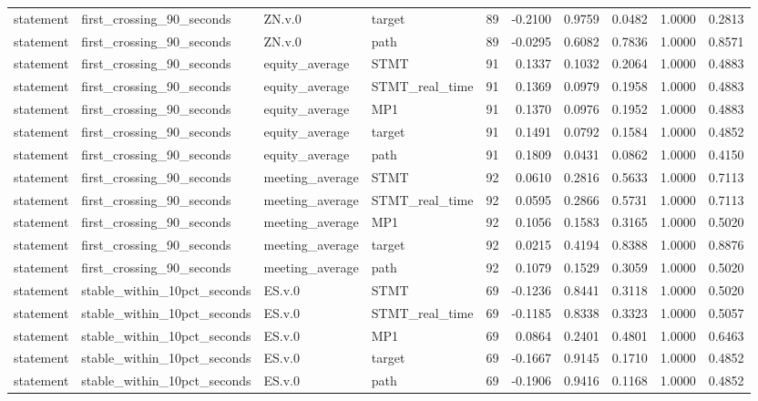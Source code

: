 \begin{tabular}{llllrrrrrr}
statement & first_crossing_90_seconds & ZN.v.0 & target & 89 & -0.2100 & 0.9759 & 0.0482 & 1.0000 & 0.2813 \\
statement & first_crossing_90_seconds & ZN.v.0 & path & 89 & -0.0295 & 0.6082 & 0.7836 & 1.0000 & 0.8571 \\
statement & first_crossing_90_seconds & equity_average & STMT & 91 & 0.1337 & 0.1032 & 0.2064 & 1.0000 & 0.4883 \\
statement & first_crossing_90_seconds & equity_average & STMT_real_time & 91 & 0.1369 & 0.0979 & 0.1958 & 1.0000 & 0.4883 \\
statement & first_crossing_90_seconds & equity_average & MP1 & 91 & 0.1370 & 0.0976 & 0.1952 & 1.0000 & 0.4883 \\
statement & first_crossing_90_seconds & equity_average & target & 91 & 0.1491 & 0.0792 & 0.1584 & 1.0000 & 0.4852 \\
statement & first_crossing_90_seconds & equity_average & path & 91 & 0.1809 & 0.0431 & 0.0862 & 1.0000 & 0.4150 \\
statement & first_crossing_90_seconds & meeting_average & STMT & 92 & 0.0610 & 0.2816 & 0.5633 & 1.0000 & 0.7113 \\
statement & first_crossing_90_seconds & meeting_average & STMT_real_time & 92 & 0.0595 & 0.2866 & 0.5731 & 1.0000 & 0.7113 \\
statement & first_crossing_90_seconds & meeting_average & MP1 & 92 & 0.1056 & 0.1583 & 0.3165 & 1.0000 & 0.5020 \\
statement & first_crossing_90_seconds & meeting_average & target & 92 & 0.0215 & 0.4194 & 0.8388 & 1.0000 & 0.8876 \\
statement & first_crossing_90_seconds & meeting_average & path & 92 & 0.1079 & 0.1529 & 0.3059 & 1.0000 & 0.5020 \\
statement & stable_within_10pct_seconds & ES.v.0 & STMT & 69 & -0.1236 & 0.8441 & 0.3118 & 1.0000 & 0.5020 \\
statement & stable_within_10pct_seconds & ES.v.0 & STMT_real_time & 69 & -0.1185 & 0.8338 & 0.3323 & 1.0000 & 0.5057 \\
statement & stable_within_10pct_seconds & ES.v.0 & MP1 & 69 & 0.0864 & 0.2401 & 0.4801 & 1.0000 & 0.6463 \\
statement & stable_within_10pct_seconds & ES.v.0 & target & 69 & -0.1667 & 0.9145 & 0.1710 & 1.0000 & 0.4852 \\
statement & stable_within_10pct_seconds & ES.v.0 & path & 69 & -0.1906 & 0.9416 & 0.1168 & 1.0000 & 0.4852 \\

\end{tabular}
